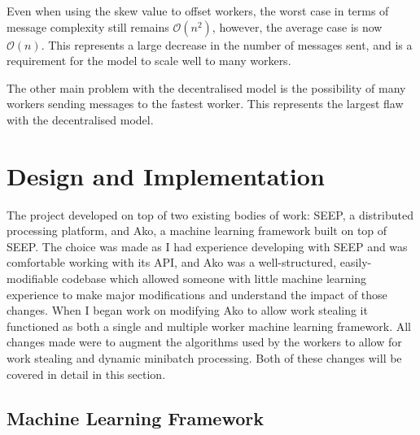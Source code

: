 \documentclass[12pt]{article}
\begin{document}
Even when using the skew value to offset workers, the worst case in terms of message complexity still remains $\mathcal{O}(n^2)$, however, the average case is now $\mathcal{O}(n)$. This represents a large decrease in the number of messages sent, and is a requirement for the model to scale well to many workers.

The other main problem with the decentralised model is the possibility of many workers sending  messages to the fastest worker. This represents the largest flaw with the decentralised model.

\newpage

\section{Design and Implementation}

The project developed on top of two existing bodies of work: SEEP, a distributed processing platform, and Ako, a machine learning framework built on top of SEEP. The choice was made as I had experience developing with SEEP and was comfortable working with its API, and Ako was a well-structured, easily-modifiable codebase which allowed someone with little machine learning experience to make major modifications and understand the impact of those changes. When I began work on modifying Ako to allow work stealing it functioned as both a single and multiple worker machine learning framework. All changes made were to augment the algorithms used by the workers to allow for work stealing and dynamic minibatch processing. Both of these changes will be covered in detail in this section.

\subsection{Machine Learning Framework}
\end{document}
